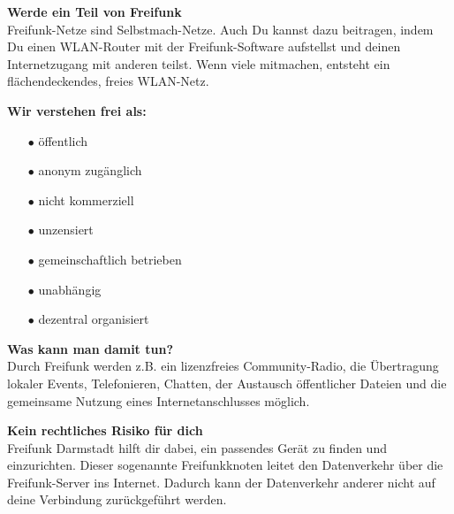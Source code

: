 \documentclass[a4paper]{article}
\begin{document}
\begin{Row}
    \begin{Cell}{5}
    \textbf{Werde ein Teil von Freifunk} \\
Freifunk-Netze sind Selbstmach-Netze. Auch Du kannst dazu beitragen, indem Du einen WLAN-Router mit der Freifunk-Software aufstellst und deinen Internetzugang mit anderen teilst. Wenn viele mitmachen, entsteht ein flächendeckendes, freies WLAN-Netz.
    \end{Cell}
    \begin{Cell}{4}
    \textbf{Wir verstehen frei als:} \vspace*{-0.18cm}
	\begin{itemize}
	   \item[\textcolor{freifunkpink}{\Large$\bullet$}] öffentlich \vspace*{-0.3cm}
	   \item[\textcolor{freifunkpink}{\Large$\bullet$}] anonym zugänglich \vspace*{-0.3cm}
	   \item[\textcolor{freifunkpink}{\Large$\bullet$}] nicht kommerziell \vspace*{-0.3cm}
	   \item[\textcolor{freifunkpink}{\Large$\bullet$}] unzensiert \vspace*{-0.3cm}
	   \item[\textcolor{freifunkpink}{\Large$\bullet$}] gemeinschaftlich betrieben\vspace*{-0.3cm}
	   \item[\textcolor{freifunkpink}{\Large$\bullet$}] unabhängig\vspace*{-0.3cm}
	   \item[\textcolor{freifunkpink}{\Large$\bullet$}] dezentral organisiert
	\end{itemize}
    \end{Cell}
\end{Row}
\newpage

\thispagestyle{empty}

\begin{Row}[cellsep=0.75cm]
    \begin{Cell}{4}
    \textbf{Was kann man damit tun?} \\
    Durch Freifunk werden z.B. ein lizenzfreies Community-Radio, die Übertragung lokaler Events, Telefonieren, Chatten, der Austausch öffentlicher Dateien und die gemeinsame Nutzung eines Internetanschlusses möglich.
    \end{Cell}
\begin{Cell}{5}
    \textbf{Kein rechtliches Risiko für dich} \\
Freifunk Darmstadt hilft dir dabei, ein passendes Gerät zu finden und einzurichten. Dieser sogenannte Freifunkknoten leitet den Datenverkehr über die Freifunk-Server ins Internet. Dadurch kann der Datenverkehr anderer nicht auf deine Verbindung zurückgeführt werden.
\end{Cell}
\end{Row}
\end{document}
